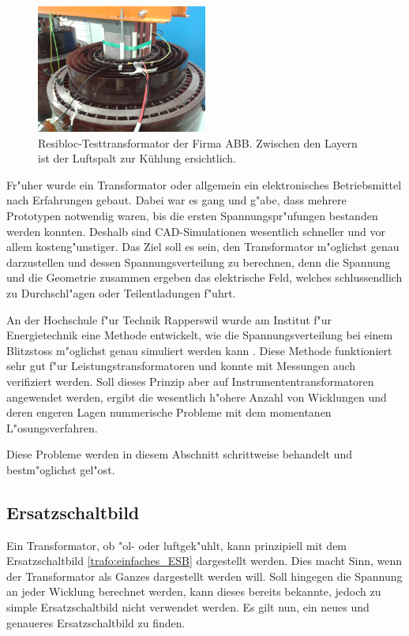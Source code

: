 \begin{refsection}
\begin{figure}
	\centering
	\includegraphics[width=0.5\textwidth]{./Trafo/images/resibloc.jpg}
	\caption{Resibloc-Testtransformator der Firma ABB. Zwischen den Layern ist der Luftspalt zur Kühlung ersichtlich.}
	\label{trafo:resibloc}
\end{figure}
Fr"uher wurde ein Transformator oder allgemein ein elektronisches Betriebsmittel nach Erfahrungen gebaut. Dabei war es gang und g"abe, dass mehrere Prototypen notwendig waren, bis die ersten Spannungspr"ufungen bestanden werden konnten. Deshalb sind CAD-Simulationen wesentlich schneller und vor allem kosteng"unstiger. Das Ziel soll es sein, den Transformator m"oglichst genau darzustellen und dessen Spannungsverteilung zu berechnen, denn die Spannung und die Geometrie zusammen ergeben das elektrische Feld, welches schlussendlich zu Durchschl"agen oder Teilentladungen f"uhrt.

An der Hochschule f"ur Technik Rapperswil wurde am Institut f"ur Energietechnik eine Methode entwickelt, wie die Spannungsverteilung bei einem Blitzstoss m"oglichst genau simuliert werden kann \cite{trafo:BILImpulse}. Diese Methode funktioniert sehr gut f"ur Leistungstransformatoren und konnte mit Messungen auch verifiziert werden. 
Soll dieses Prinzip aber auf Instrumententransformatoren angewendet werden, ergibt die wesentlich h"ohere Anzahl von Wicklungen und deren engeren Lagen nummerische Probleme mit dem momentanen L"osungsverfahren. 

Diese Probleme werden in diesem Abschnitt schrittweise behandelt und bestm"oglichst gel"ost. 


\subsection{Ersatzschaltbild}
Ein Transformator, ob "ol- oder luftgek"uhlt, kann prinzipiell mit dem Ersatzschaltbild \ref{trafo:einfaches_ESB} dargestellt werden. Dies macht Sinn, wenn der Transformator als Ganzes dargestellt werden will. Soll hingegen die Spannung an jeder Wicklung berechnet werden, kann dieses bereits bekannte, jedoch zu simple Ersatzschaltbild nicht verwendet werden. Es gilt nun, ein neues und genaueres Ersatzschaltbild zu finden. 


\end{refsection}
